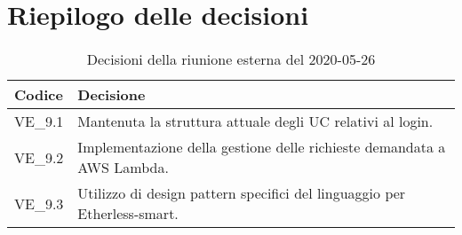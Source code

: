 \section{Riepilogo delle decisioni}
\begin{longtable}{
	 >{\centering}p{} >{}p{} }
	\caption{Decisioni della riunione esterna del 2020-05-26}\\

	\textbf{\color{white}Codice} &
	\textbf{\color{white}Decisione}
	\tabularnewline
	\endhead

	VE\_9.1 & Mantenuta la struttura attuale degli UC relativi al login. \\
	VE\_9.2 & Implementazione della gestione delle richieste demandata a AWS Lambda. \\
	VE\_9.3 & Utilizzo di design pattern specifici del linguaggio per Etherless-smart. \\
\end{longtable}
